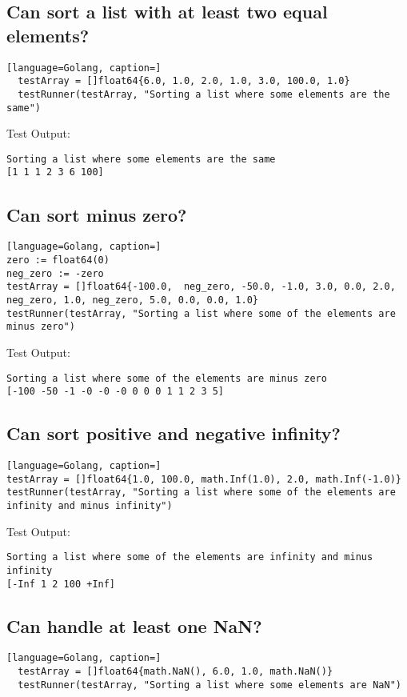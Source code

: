\documentclass{article}
\begin{document}
\subsection{Can sort a list with at least two equal elements?}
\begin{lstlisting}[language=Golang, caption=]
  testArray = []float64{6.0, 1.0, 2.0, 1.0, 3.0, 100.0, 1.0}
  testRunner(testArray, "Sorting a list where some elements are the same")
\end{lstlisting}

Test Output:
\begin{lstlisting}
Sorting a list where some elements are the same
[1 1 1 2 3 6 100]
\end{lstlisting}


\subsection{Can sort minus zero?}
\begin{lstlisting}[language=Golang, caption=]
zero := float64(0)
neg_zero := -zero
testArray = []float64{-100.0,  neg_zero, -50.0, -1.0, 3.0, 0.0, 2.0, neg_zero, 1.0, neg_zero, 5.0, 0.0, 0.0, 1.0}
testRunner(testArray, "Sorting a list where some of the elements are minus zero")
\end{lstlisting}

Test Output:
\begin{lstlisting}
Sorting a list where some of the elements are minus zero
[-100 -50 -1 -0 -0 -0 0 0 0 1 1 2 3 5]
\end{lstlisting}

\subsection{Can sort positive and negative infinity?}
\begin{lstlisting}[language=Golang, caption=]
testArray = []float64{1.0, 100.0, math.Inf(1.0), 2.0, math.Inf(-1.0)}
testRunner(testArray, "Sorting a list where some of the elements are infinity and minus infinity")
\end{lstlisting}

Test Output:
\begin{lstlisting}
Sorting a list where some of the elements are infinity and minus infinity
[-Inf 1 2 100 +Inf]
\end{lstlisting}

\subsection{Can handle at least one NaN?}
\begin{lstlisting}[language=Golang, caption=]
  testArray = []float64{math.NaN(), 6.0, 1.0, math.NaN()}
  testRunner(testArray, "Sorting a list where some elements are NaN")
\end{lstlisting}
\end{document}
